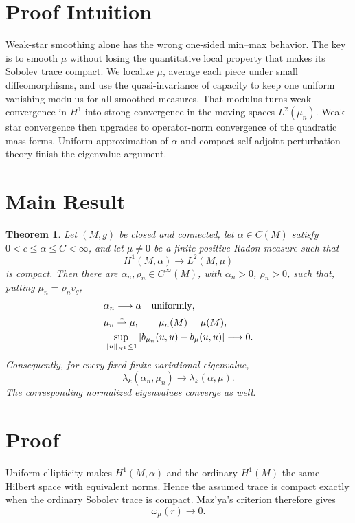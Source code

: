 \documentclass[11pt]{article}
\newtheorem{theorem}{Theorem}
\begin{document}
\section*{Proof Intuition}

Weak-star smoothing alone has the wrong one-sided min--max behavior. The key
is to smooth \(\mu\) without losing the quantitative local property that makes
its Sobolev trace compact. We localize \(\mu\), average each piece under small
diffeomorphisms, and use the quasi-invariance of capacity to keep one uniform
vanishing modulus for all smoothed measures. That modulus turns weak
convergence in \(H^1\) into strong convergence in the moving spaces
\(L^2(\mu_n)\). Weak-star convergence then upgrades to operator-norm
convergence of the quadratic mass forms. Uniform approximation of \(\alpha\)
and compact self-adjoint perturbation theory finish the eigenvalue argument.

\section*{Main Result}

\begin{theorem}\label{thm:main}
Let \((M,g)\) be closed and connected, let \(\alpha\in C(M)\) satisfy
\(0<c\leq\alpha\leq C<\infty\), and let \(\mu\ne0\) be a finite positive
Radon measure such that
\[
 H^1(M,\alpha)\longrightarrow L^2(M,\mu)
\]
is compact. Then there are \(\alpha_n,\rho_n\in C^\infty(M)\), with
\(\alpha_n>0\), \(\rho_n>0\), such that, putting
\(\mu_n=\rho_n v_g\),
\begin{align*}
 &\alpha_n\longrightarrow\alpha \quad\hbox{uniformly},\\
 &\mu_n\stackrel{*}{\rightharpoonup}\mu,
 \qquad \mu_n(M)=\mu(M),\\
 &\sup_{\|u\|_{H^1}\leq1}
   \left|b_{\mu_n}(u,u)-b_\mu(u,u)\right|\longrightarrow0.
\end{align*}
Consequently, for every fixed finite variational eigenvalue,
\[
 \lambda_k(\alpha_n,\mu_n)\longrightarrow\lambda_k(\alpha,\mu).
\]
The corresponding normalized eigenvalues converge as well.
\end{theorem}

\section*{Proof}

Uniform ellipticity makes \(H^1(M,\alpha)\) and the ordinary \(H^1(M)\)
the same Hilbert space with equivalent norms. Hence the assumed trace is
compact exactly when the ordinary Sobolev trace is compact. Maz'ya's criterion
therefore gives
\begin{equation}\label{eq:vanish}
 \omega_\mu(r)\longrightarrow0.
\end{equation}
\end{document}
